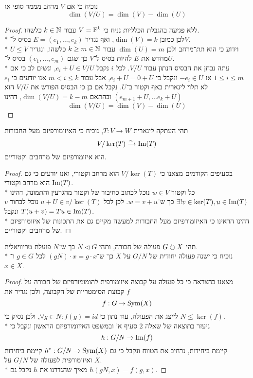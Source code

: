 \Subquestion{}
נוכיח כי אם $V$ מרחב מממד סופי אז
\[
	\dim(V/U) = \dim(V) - \dim(U)
\]
\begin{proof}
	ללא פגיעה בהגבלת הכלליות נניח כי $V = \mathbb{F}^k$ עבור $k \in \mathbb{N}$ כלשהו. \\*
	לכן כמובן $\dim(V) = k$, ואף נגדיר $E = (e_1, \dots, e_k)$ בסיס ל־$V$. \\*
	$U \le V$ וידוע כי הוא תת־מרחב ולכן $\dim(U) = m$ עבור $k \ge m \in \mathbb{N}$ כלשהו, ונגדיר מחדש את $E$ להיות בסיס ל־$V$ כך שגם $(e_1, \dots, e_m)$ בסיס ל־$U$. \\*
	עתה נבחן את הבסיס הנתון עבור $V/U$. לכל $i$ נקבל $e_i + U \in V/U$, ונשים לב כי אם $1 \le i \le m$ אז $-e_i \in U$ ונקבל כי $e_i + U = 0 + U$, אבל עבור $m < i \le k$ אנו יודעים כי $e_i$ לא תלוי לינארית באף וקטור ב־$U$.
	נקבל אם כן כי הבסיס הפורש את $V/U$ הוא $(e_{m + 1} + U, \dots e_k + U)$ ובהתאם $\dim(V/U) = k - m$, דהינו
	\[
		\dim(V/U) = \dim(V) - \dim(U)
	\]
\end{proof}

\Subquestion{}
תהי העתקה לינארית $T : V \to W$, נוכיח כי האיזומורפיזם מעל החבורות
\[
	V / \ker(T) \xrightarrow{\sim} \operatorname{Im}(T)
\]
הוא איזומורפיזם של מרחבים וקטוריים.
\begin{proof}
	בסעיפים הקודמים מצאנו כי $V/\ker(T)$ הוא מרחב וקטורי, ואנו יודעים כי גם $\operatorname{Im}(T)$ הוא מרחב וקטורי. \\*
	כל וקטור $w \in V$ נוכל לכתוב כחיבור של וקטור מהגרעין והתמונה, דהינו $\exists ! v \in \ker(T), u \in \operatorname{Im}(T)$ כך ש־$w = v + u$.
	לכן לכל $u + U \in v/\ker(T)$ נוכל לבחור $v$ ונקבל $T(u + v) = Tu \in \operatorname{Im}(T)$. \\*
	דהינו הראינו כי האיזומורפיזם מעל החבורות למעשה מקיים גם את התכונות של איזומורפיזם של מרחבים וקטוריים.
\end{proof}

\Question{}
\Subquestion{}
תהי $G \circlearrowright X$ פעולה של חבורה, ותהי $N \triangleleft G$ כך ש־$N$ פועלת טריוויאלית. \\*
נוכיח כי ישנה פעולה יחודית של $G/N$ על $X$ כך ש־$(gN) \cdot x = g \cdot x$ לכל $g \in G$ ו־$x \in X$.
\begin{proof}
	מצאנו בהצראה כי כל פעולה על קבוצה איזומורפית להומומורפיזם של חבורה על קבוצת הסימטריות של הקבוצה, ולכן נגדיר את $f$
	\[
		f : G \to \operatorname{Sym}(X)
	\]
	לייצג את הפעולה, עוד נתון כי $\forall g \in N : f(g) = id$, ולכן נסיק כי $N \le \ker(f)$. \\*
	ניעזר בתוצאה של שאלה 2 סעיף א' ובמשפט האיזומורפיזם הראשון ונקבל כי
	\[
		h : G/N \to \operatorname{Im}(f)
	\]
	קיימת ביחידות, נרחיב את הטווח ונקבל כי גם $h^* : G/N \to \operatorname{Sym}(X)$ קיימת ביחידות ואיזומורפית לפעולה של $G/N$ על $X$. \\*
	מאיך שהגדרנו את $h$ נקבל גם $h(gN, x) = f(g, x)$.
\end{proof}

